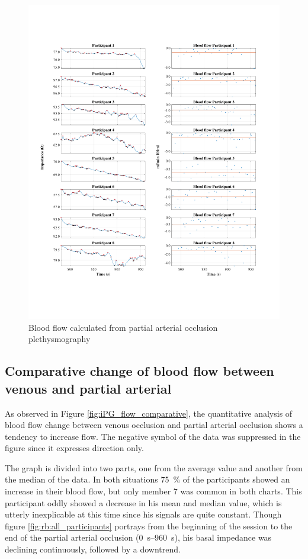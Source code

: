 \begin{figure}
	\includegraphics[width=\textwidth,height=\textheight,keepaspectratio,trim={0.5cm 0.5cm 2cm 2cm},clip]{figure13}    
	\caption{Blood flow calculated from partial arterial occlusion plethysmography}
	\label{fig:blood_flow:arterial_occlusion}
\end{figure}

\subsection{Comparative change of blood flow between venous and partial arterial}
\label{section results 4.3}
As observed in Figure \ref{fig:iPG_flow_comparative}, the quantitative analysis of blood flow change between venous occlusion and partial arterial occlusion shows a tendency to increase flow. The negative symbol of the data was suppressed in the figure since it expresses direction only. 

The graph is divided into two parts, one from the average value and another from the median of the data.  In both situations \SI{75}{\percent} of the participants showed an increase in their blood flow, but only member 7 was common in both charts. This participant oddly showed a decrease in his mean and median value, which is utterly inexplicable at this time since his signals are quite constant. Though figure \ref{fig:rb:all_participants} portrays from the beginning of the session to the end of the partial arterial occlusion  (\SIrange{0}{960}{\second}), his basal impedance was declining continuously, followed by a downtrend. 

